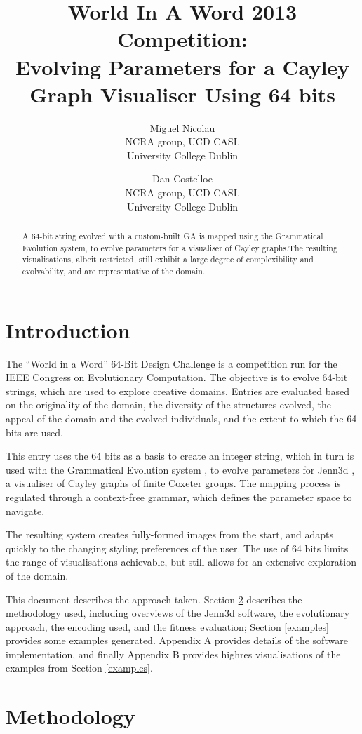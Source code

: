 \documentclass{article}
\title{World In A Word 2013 Competition:\\
Evolving Parameters for a Cayley Graph Visualiser Using 64 bits}
\author{Miguel Nicolau\\
NCRA group, UCD CASL\\
University College Dublin
\and Dan Costelloe\\
NCRA group, UCD CASL\\
University College Dublin}
\date{}
\begin{document}
\maketitle
\begin{abstract}
A 64-bit string evolved with a custom-built GA is mapped using the Grammatical
Evolution system, to evolve parameters for a visualiser of Cayley graphs.The
resulting visualisations, albeit restricted, still exhibit a large degree of
complexibility and evolvability, and are representative of the domain.
\end{abstract}

\section{Introduction}
The ``World in a Word'' 64-Bit Design Challenge \cite{browne2013a} is a
competition run for the IEEE Congress on Evolutionary Computation. The
objective is to evolve 64-bit strings, which are used to explore creative
domains. Entries are evaluated based on the originality of the domain, the
diversity of the structures evolved, the appeal of the domain and the evolved
individuals, and the extent to which the 64 bits are used.

This entry uses the 64 bits as a basis to create an integer string, which in
turn is used with the Grammatical Evolution system \cite{oneill03b}, to
evolve parameters for Jenn3d \cite{obermeyer10a}, a visualiser of Cayley graphs of
finite Coxeter groups. The mapping process is regulated through a context-free
grammar, which defines the parameter space to navigate.

The resulting system creates fully-formed images from the start, and adapts
quickly to the changing styling preferences of the user. The use of 64 bits
limits the range of visualisations achievable, but still allows for an
extensive exploration of the domain.

This document describes the approach taken. Section \ref{methodology} describes
the methodology used, including overviews of the Jenn3d software, the
evolutionary approach, the encoding used, and the fitness evaluation; Section
\ref{examples} provides some examples generated. Appendix A provides details of
the software implementation, and finally Appendix B provides highres
visualisations of the examples from Section \ref{examples}.

\section{Methodology}
\label{methodology}
\end{document}
